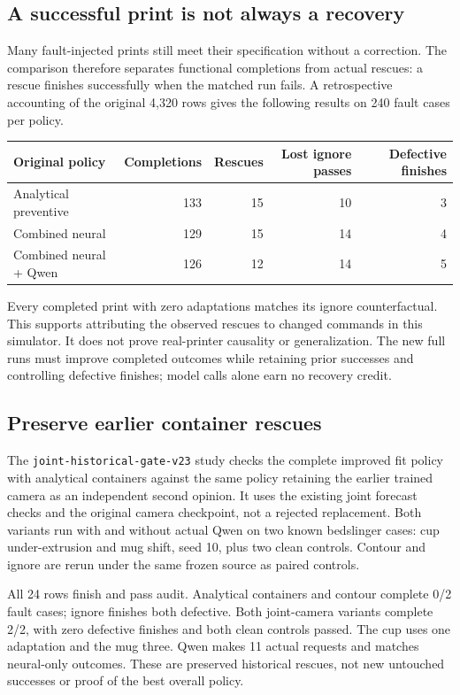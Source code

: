 \documentclass[10pt,letterpaper]{article}
\newcommand{\code}[1]{\texttt{\detokenize{#1}}}
\begin{document}
\subsection*{A successful print is not always a recovery}
Many fault-injected prints still meet their specification without a correction.
The comparison therefore separates functional completions from actual rescues:
a rescue finishes successfully when the matched \code{ignore} run fails. A
retrospective accounting of the original 4,320 rows gives the following results
on 240 fault cases per policy.

\begin{center}
\begin{tabular}{@{}lrrrr@{}}
\toprule
Original policy & Completions & Rescues & Lost ignore passes & Defective finishes \\
\midrule
Analytical preventive & 133 & 15 & 10 & 3 \\
Combined neural & 129 & 15 & 14 & 4 \\
Combined neural + Qwen & 126 & 12 & 14 & 5 \\
\bottomrule
\end{tabular}
\end{center}

Every completed print with zero adaptations matches its ignore counterfactual.
This supports attributing the observed rescues to changed commands in this
simulator. It does not prove real-printer causality or generalization. The new
full runs must improve completed outcomes while retaining prior successes and
controlling defective finishes; model calls alone earn no recovery credit.

\subsection*{Preserve earlier container rescues}
The \texttt{joint-historical-gate-v23} study checks the complete improved fit
policy with analytical containers against the same policy retaining the earlier
trained camera as an independent second opinion. It uses the existing joint
forecast checks and the original camera checkpoint, not a rejected replacement.
Both variants run with and without actual Qwen on two known bedslinger cases:
cup under-extrusion and mug shift, seed 10, plus two clean controls. Contour and
ignore are rerun under the same frozen source as paired controls.

All 24 rows finish and pass audit. Analytical containers and contour complete
0/2 fault cases; ignore finishes both defective. Both joint-camera variants
complete 2/2, with zero defective finishes and both clean controls passed. The
cup uses one adaptation and the mug three. Qwen makes 11 actual requests and
matches neural-only outcomes. These are preserved historical rescues, not new
untouched successes or proof of the best overall policy.
\end{document}
